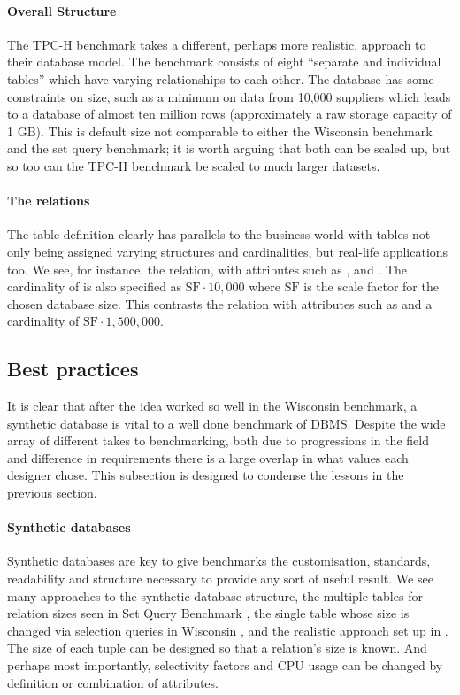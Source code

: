 \paragraph{Overall Structure} The TPC-H benchmark takes a different, perhaps more
realistic, approach to their database model. The benchmark consists of eight
``separate and individual tables'' which have varying relationships to each
other. The database has some constraints on size, such as a minimum on data from
10,000 suppliers which leads to a database of almost ten million rows
(approximately a raw storage capacity of 1 GB). This is default size not
comparable to either the Wisconsin benchmark and the set query benchmark; it is
worth arguing that both can be scaled up, but so too can the TPC-H benchmark be
scaled to much larger datasets.

\paragraph{The relations} The table definition clearly has parallels to the business world with
tables not only being assigned varying structures and cardinalities, but
real-life applications too. We see, for instance, the 
relation, with attributes such as ,
 and . The cardinality of
 is also specified as $\mathrm{SF} \cdot 10,000$ where
$\mathrm{SF}$ is the scale factor for the chosen database size. This contrasts
the  relation with attributes such as
 and
a cardinality of $\mathrm{SF} \cdot 1,500,000$.

\subsection{Best practices}
It is clear that after the idea worked so well in the Wisconsin benchmark, a
synthetic database is vital to a well done benchmark of DBMS. Despite the wide
array of different takes to benchmarking, both due to progressions in the field
and difference in requirements there is a large overlap in what values each
designer chose. This subsection is designed to condense the lessons in the
previous section.

\paragraph{Synthetic databases} Synthetic databases are key to give benchmarks
the customisation, standards, readability and structure necessary to provide any
sort of useful result. We see many approaches to the synthetic database
structure, the multiple tables for relation sizes seen in
Set Query Benchmark \cite{SetQueryBenchmark}, the single table whose size is changed via selection
queries in Wisconsin \cite{Wisconsin}, and the realistic approach set up in
\cite{TPC-H}. The size of each tuple can be designed so that a relation's size
is known. And perhaps most importantly, selectivity factors and CPU usage can be
changed by definition or combination of attributes.

